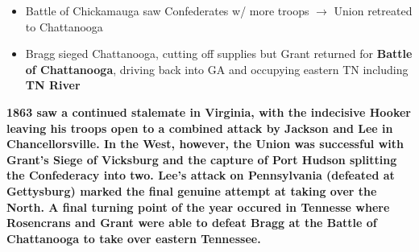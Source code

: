 \documentclass[a4paper]{article}
\begin{document}
{\begin{itemize}
        \begin{itemize}
            \item Battle of Chickamauga saw Confederates w/ more troops $\to$ Union retreated to Chattanooga
            \item Bragg sieged Chattanooga, cutting off supplies but Grant returned for \textbf{Battle of Chattanooga}, driving back into GA and occupying eastern TN including \textbf{TN River} 
        \end{itemize}
    \end{itemize}
    \textbf{1863 saw a continued stalemate in Virginia, with the indecisive Hooker leaving his troops open to a combined attack by Jackson and Lee in Chancellorsville. In the West, however, the Union was successful with Grant's Siege of Vicksburg and the capture of Port Hudson splitting the Confederacy into two. Lee's attack on Pennsylvania (defeated at Gettysburg) marked the final genuine attempt at taking over the North. A final turning point of the year occured in Tennesse where Rosencrans and Grant were able to defeat Bragg at the Battle of Chattanooga to take over eastern Tennessee.}}
\end{document}
